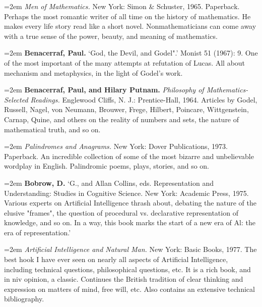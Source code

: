 \par\noindent\hangindent=2em  {\it Men of Mathematics.} New York: Simon \& Schuster, 1965. Paperback. Perhaps the most romantic writer of all time on the history of mathematics. He makes every life story read like a short novel. Nonmathematicians can come away with a true sense of the power, beauty, and meaning of mathematics.

\par\noindent\hangindent=2em {\bf Benacerraf, Paul.} `God, the Devil, and Godel".' Monist 51 (1967): 9. One of the most important of the many attempts at refutation of Lucas. All about mechanism and metaphysics, in the light of Godel's work.

\par\noindent\hangindent=2em {\bf Benacerraf, Paul, and Hilary Putnam.} {\it Philosophy of Mathematics-Selected Readings.} Englewood Cliffs, N. J.: Prentice-Hall, 1964. Articles by Godel, Russell, Nagel, von Neumann, Brouwer, Frege, Hilbert, Poincare, Wittgenstein, Carnap, Quine, and others on the reality of numbers and sets, the nature of mathematical truth, and so on.

\par\noindent\hangindent=2em  {\it Palindromes and Anagrams.} New York: Dover Publications, 1973. Paperback. An incredible collection of some of the most bizarre and unbelievable wordplay in English. Palindromic poems, plays, stories, and so on.

\par\noindent\hangindent=2em {\bf Bobrow, D.} `G., and Allan Collins, eds. Representation and Understanding: Studies in Cognitive Science. New York: Academic Press, 1975. Various experts on Artificial Intelligence thrash about, debating the nature of the elusive "frames", the question of procedural vs. declarative representation of knowledge, and so on. In a way, this book marks the start of a new era of Al: the era of representation.' 

\par\noindent\hangindent=2em  {\it Artificial Intelligence and Natural Man.} New York: Basic Books, 1977. The best hook I have ever seen on nearly all aspects of Artificial Intelligence, including technical questions, philosophical questions, etc. It is a rich book, and in niv opinion, a classic. Continues the British tradition of clear thinking and expression on matters of mind, free will, etc. Also contains an extensive technical bibliography.

